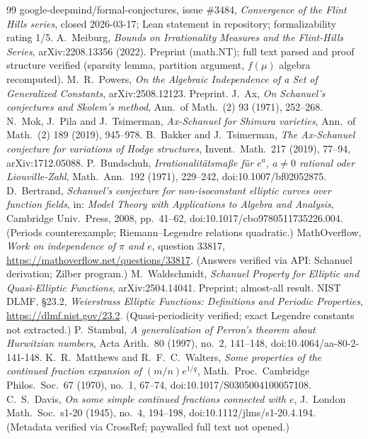 \documentclass[11pt]{amsart}
\theoremstyle{definition}
\theoremstyle{remark}
\numberwithin{equation}{section}
\begin{document}
\begin{thebibliography}{99}
 google-deepmind/formal-conjectures, issue \#3484, \emph{Convergence of the Flint Hills series}, closed 2026-03-17; Lean statement in repository; formalizability rating 1/5.
 A.~Meiburg, \emph{Bounds on Irrationality Measures and the Flint-Hills Series}, arXiv:2208.13356 (2022). Preprint (math.NT); full text parsed and proof structure verified (sparsity lemma, partition argument, $f(\mu)$ algebra recomputed).
 M.~R.~Powers, \emph{On the Algebraic Independence of a Set of Generalized Constants}, arXiv:2508.12123. Preprint.
 J.~Ax, \emph{On Schanuel's conjectures and Skolem's method}, Ann.~of Math.~(2) 93 (1971), 252--268.
 N.~Mok, J.~Pila and J.~Tsimerman, \emph{Ax-Schanuel for Shimura varieties}, Ann.~of Math.~(2) 189 (2019), 945--978.
 B.~Bakker and J.~Tsimerman, \emph{The Ax-Schanuel conjecture for variations of Hodge structures}, Invent.~Math.~217 (2019), 77--94, arXiv:1712.05088.
 P.~Bundschuh, \emph{Irrationalit\"atsma\ss e f\"ur $e^a$, $a\ne0$ rational oder Liouville-Zahl}, Math.~Ann.~192 (1971), 229--242, doi:10.1007/bf02052875.
 D.~Bertrand, \emph{Schanuel's conjecture for non-isoconstant elliptic curves over function fields}, in: \emph{Model Theory with Applications to Algebra and Analysis}, Cambridge Univ.~Press, 2008, pp.~41--62, doi:10.1017/cbo9780511735226.004. (Periods counterexample; Riemann--Legendre relations quadratic.)
 MathOverflow, \emph{Work on independence of $\pi$ and $e$}, question 33817, \url{https://mathoverflow.net/questions/33817}. (Answers verified via API: Schanuel derivation; Zilber program.)
 M.~Waldschmidt, \emph{Schanuel Property for Elliptic and Quasi-Elliptic Functions}, arXiv:2504.14041. Preprint; almost-all result.
 NIST DLMF, \S23.2, \emph{Weierstrass Elliptic Functions: Definitions and Periodic Properties}, \url{https://dlmf.nist.gov/23.2}. (Quasi-periodicity verified; exact Legendre constants not extracted.)
 P.~Stambul, \emph{A generalization of Perron's theorem about Hurwitzian numbers}, Acta Arith.~80 (1997), no.~2, 141--148, doi:10.4064/aa-80-2-141-148.
 K.~R.~Matthews and R.~F.~C.~Walters, \emph{Some properties of the continued fraction expansion of $(m/n)e^{1/q}$}, Math.~Proc.~Cambridge Philos.~Soc.~67 (1970), no.~1, 67--74, doi:10.1017/S0305004100057108.
 C.~S.~Davis, \emph{On some simple continued fractions connected with $e$}, J.~London Math.~Soc.~s1-20 (1945), no.~4, 194--198, doi:10.1112/jlms/s1-20.4.194. (Metadata verified via CrossRef; paywalled full text not opened.)

\end{thebibliography}
\end{document}

